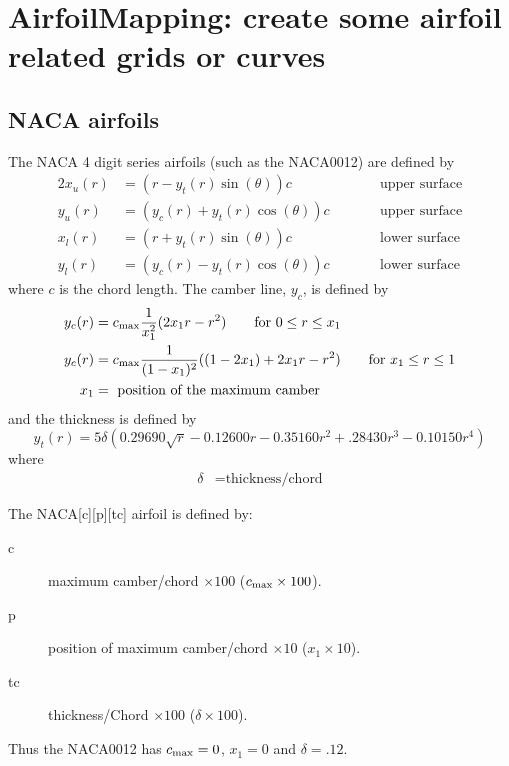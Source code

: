 \section{AirfoilMapping: create some airfoil related grids or curves}\label{sec:AirfoilMapping}

\subsection{NACA airfoils}

The NACA 4 digit series airfoils (such as the NACA0012) are defined by 
\begin{alignat*}{2}
  x_u(r) &= (r - y_t(r) \sin(\theta) ) c   &\qquad &\mbox{upper surface}\\
  y_u(r) &= (y_c(r) + y_t(r) \cos(\theta) ) c &\qquad &\mbox{upper surface}\\
  x_l(r) &= (r + y_t(r) \sin(\theta)  ) c   &\qquad &\mbox{lower surface}\\
  y_l(r) &= (y_c(r) - y_t(r) \cos(\theta) ) c &\qquad &\mbox{lower surface}
\end{alignat*}
where $c$ is the chord length. The camber line, $y_c$, is defined by
\begin{align*}
   y_c(r) & = c_{\rm max} {1\over x_1^2} ( 2 x_1 r - r^2 ) \qquad\mbox{for $0\le r \le x_1$} \\
   y_c(r) & = c_{\rm max} {1\over (1-x_1)^2} ( (1-2 x_1) + 2 x_1 r - r^2 ) \qquad\mbox{for $x_1\le r \le 1$} \\
   x_1  &= \mbox{ position of the maximum camber}
\end{align*}
and the thickness is defined by
\[
   y_t(r) = 5 \delta( 0.29690\sqrt{r} - 0.12600 r -0.35160 r^2 + .28430 r^3 - 0.10150 r^4 )
\]
where
\begin{align*}
   \delta &= \mbox{thickness/chord}
\end{align*}

The NACA[c][p][tc] airfoil is defined by:
\begin{description}
 \item[c]  maximum camber/chord $\times 100$  ($c_{\rm max}\times 100$).
 \item[p]  position of maximum camber/chord $\times 10$ ($x_1\times 10$).
 \item[tc]  thickness/Chord $\times 100$ ($\delta\times100$).
\end{description}
Thus the NACA0012 has $c_{\rm max}=0$, $x_1=0$ and $\delta=.12$.

